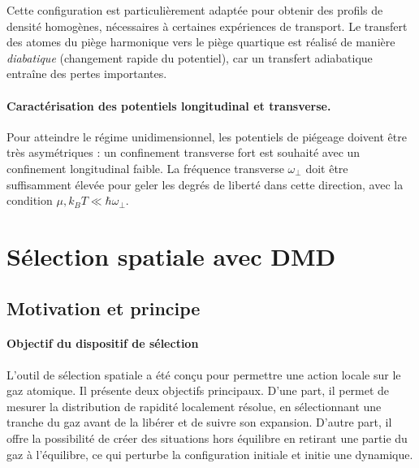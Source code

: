 \medskip

Cette configuration est particulièrement adaptée pour obtenir des profils de densité homogènes, nécessaires à certaines expériences de transport. Le transfert des atomes du piège harmonique vers le piège quartique est réalisé de manière \emph{diabatique} (changement rapide du potentiel), car un transfert adiabatique entraîne des pertes importantes.

\paragraph{Caractérisation des potentiels longitudinal et transverse.}
Pour atteindre le régime unidimensionnel, les potentiels de piégeage doivent être très asymétriques : un confinement transverse fort est souhaité avec un confinement longitudinal faible. La fréquence transverse \(\omega_\perp\) doit être suffisamment élevée pour geler les degrés de liberté dans cette direction, avec la condition \(\mu, k_B T \ll \hbar \omega_\perp\).



\section{Sélection spatiale avec DMD}
\subsection{Motivation et principe}

\paragraph{Objectif du dispositif de sélection}

L’outil de sélection spatiale a été conçu pour permettre une action locale sur le gaz atomique. Il présente deux objectifs principaux. D’une part, il permet de mesurer la distribution de rapidité localement résolue, en sélectionnant une tranche du gaz avant de la libérer et de suivre son expansion. D’autre part, il offre la possibilité de créer des situations hors équilibre en retirant une partie du gaz à l’équilibre, ce qui perturbe la configuration initiale et initie une dynamique.

